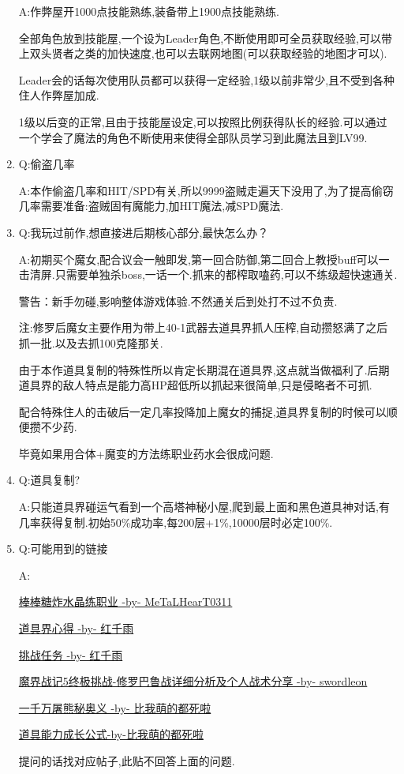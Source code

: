 \begin{enumerate}
	A:作弊屋开1000点技能熟练,装备带上1900点技能熟练.

	全部角色放到技能屋,一个设为Leader角色,不断使用即可全员获取经验,可以带上双头贤者之类的加快速度,也可以去联网地图(可以获取经验的地图才可以).

	Leader会的话每次使用队员都可以获得一定经验,1级以前非常少,且不受到各种住人作弊屋加成.

	1级以后变的正常,且由于技能屋设定,可以按照比例获得队长的经验.可以通过一个学会了魔法的角色不断使用来使得全部队员学习到此魔法且到LV99.

	\item
	Q:偷盗几率

	A:本作偷盗几率和HIT/SPD有关,所以9999盗贼走遍天下没用了,为了提高偷窃几率需要准备:盗贼固有魔能力,加HIT魔法,减SPD魔法.

	\item
	Q:我玩过前作,想直接进后期核心部分,最快怎么办？

	A:初期买个魔女,配合议会一触即发,第一回合防御,第二回合上教授buff可以一击清屏.只需要单独杀boss,一话一个.抓来的都榨取嗑药,可以不练级超快速通关.

	警告：新手勿碰,影响整体游戏体验.不然通关后到处打不过不负责.

	注:修罗后魔女主要作用为带上40-1武器去道具界抓人压榨,自动攒怒满了之后抓一批.以及去抓100克隆那关.

	由于本作道具复制的特殊性所以肯定长期混在道具界,这点就当做福利了.后期道具界的敌人特点是能力高HP超低所以抓起来很简单,只是侵略者不可抓.

	配合特殊住人的击破后一定几率投降加上魔女的捕捉,道具界复制的时候可以顺便攒不少药.

	毕竟如果用合体+魔变的方法练职业药水会很成问题.


	\item
	Q:道具复制?

	A:只能道具界碰运气看到一个高塔神秘小屋,爬到最上面和黑色道具神对话,有几率获得复制.初始50\%成功率,每200层+1\%,10000层时必定100\%.


	\item
	Q:可能用到的链接

	A:

	\href{http://tieba.baidu.com/p/3717431968}{棒棒糖炸水晶练职业 -by- MeTaLHearT0311}

	\href{http://tieba.baidu.com/p/3730196003}{道具界心得 -by- 红千雨}

	\href{http://tieba.baidu.com/p/3723862919}{挑战任务 -by- 红千雨}

	\href{http://tieba.baidu.com/p/3949061316}{魔界战记5终极挑战-修罗巴鲁战详细分析及个人战术分享 -by- swordleon}

	\href{http://tieba.baidu.com/p/3825275063}{一千万屠熊秘奥义 -by- 比我萌的都死啦}

	\href{http://tieba.baidu.com/f?kz=3834692385}{道具能力成长公式-by-比我萌的都死啦}

	提问的话找对应帖子,此贴不回答上面的问题.

\end{enumerate}


